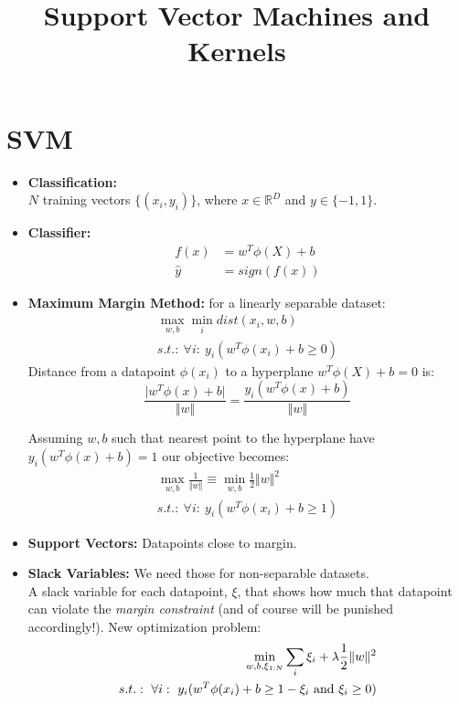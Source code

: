 \documentclass[]{article}
\title{Support Vector Machines and Kernels}
\author{}
\newcommand{\T}{^T}
\begin{document}
\maketitle

%

\section{SVM}
\begin{itemize}
\item
\textbf{Classification:}\\
$N$ training vectors $\{(x_i, y_i)\}$, where $x\in 	\mathbb{R}^D$ and $y\in \{-1, 1\}$.

\item 
\textbf{Classifier:}
\begin{align*}
	f(x) &= w\T \phi(X) + b\\
	\hat{y} &= sign(f(x))
\end{align*}

\item \textbf{Maximum Margin Method:} for a linearly separable dataset:
\begin{align*}
\max_{w, b} \min_{i} dist(x_i, w, b)\\
s.t.:\ \forall i:\ y_i(w\T \phi(x_i) + b \geq 0)
\end{align*}
Distance from a datapoint $\phi(x_i)$ to a hyperplane $w\T \phi(X) + b = 0$ is:
\begin{equation*}
\frac{\vert w\T \phi(x) + b\vert}{\Vert w\Vert} = \frac{y_i(w\T \phi(x) + b)}{\Vert w\Vert}
\end{equation*}

Assuming $w, b$ such that nearest point to the hyperplane have $y_i(w\T \phi(x) + b) = 1$ our objective becomes:
\begin{align*}
\max_{w, b} \frac{1}{\Vert w\Vert} \equiv \min_{w, b} \frac{1}{2}\Vert w\Vert^2
\tag{A quadratic program}\\
s.t.:\ \forall i:\ y_i(w\T \phi(x_i) + b \geq 1)
\end{align*}

\item \textbf{Support Vectors:} Datapoints close to margin.
\item \textbf{Slack Variables:} We need those for non-separable datasets.\\
A slack variable for each datapoint, $ \xi $, that shows how much that datapoint can violate the \textit{margin constraint} (and of course will be punished accordingly!). New optimization problem:
\begin{align*}
\min_{w, b, \xi_{1:N}}\sum_{i}\xi_i + \lambda \frac{1}{2}\Vert w\Vert^2\\
	s.t.:\ \forall i:\ y_i(w\T \phi(x_i) + b \geq 1-\xi_i \textup{ and } \xi_i \geq 0)
\end{align*}


\end{itemize}
\end{document}
